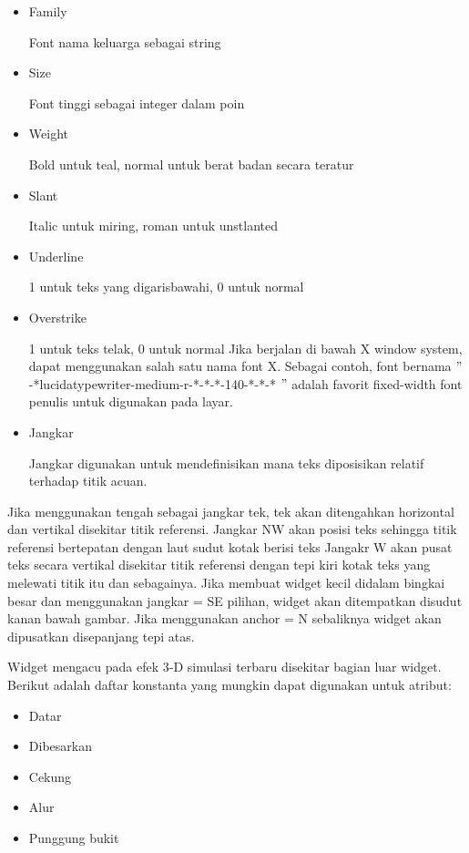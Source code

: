 \begin{itemize}
\item Family 

Font nama keluarga sebagai string 
\item Size 

Font tinggi sebagai integer dalam poin 
\item Weight 

Bold untuk teal, normal untuk berat badan secara teratur 
\item Slant 

Italic untuk miring, roman untuk unstlanted 
\item Underline 

1 untuk teks yang digarisbawahi, 0 untuk normal 
\item Overstrike 

1 untuk teks telak, 0 untuk normal 
Jika berjalan di bawah X window system, dapat menggunakan salah satu nama font X. Sebagai contoh, font bernama  $ " $-*lucidatypewriter-medium-r-*-*-*-140-*-*-* $ " $ adalah favorit fixed-width font penulis untuk digunakan pada layar. 
\item Jangkar  

Jangkar digunakan untuk mendefinisikan mana teks diposisikan relatif terhadap titik acuan. 
\end{itemize}
 
\vspace{12pt}
\hspace*{0.5in} Jika menggunakan tengah sebagai jangkar tek, tek akan ditengahkan horizontal dan vertikal disekitar titik referensi. 
Jangkar NW akan posisi teks sehingga titik referensi bertepatan dengan laut sudut kotak berisi teks 
Jangakr W akan pusat teks secara vertikal disekitar titik referensi dengan tepi kiri kotak teks yang melewati titik itu dan sebagainya. 
Jika membuat widget kecil didalam bingkai besar dan menggunakan jangkar = SE pilihan, widget akan ditempatkan disudut kanan bawah gambar. Jika menggunakan anchor = N sebaliknya widget akan dipusatkan disepanjang tepi atas. 

\hspace*{0.5in}Widget mengacu pada efek 3-D simulasi terbaru disekitar bagian luar widget. Berikut adalah daftar konstanta yang mungkin dapat digunakan untuk atribut: 
 
\begin{itemize}
\item Datar 
 
\item Dibesarkan 
 
\item Cekung 
 
\item Alur 
 
\item Punggung bukit
\end{itemize}
 
